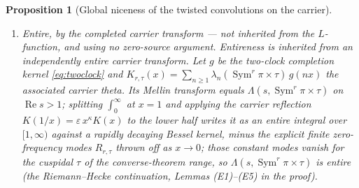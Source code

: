 \documentclass[11pt]{article}
\newtheorem{proposition}[theorem]{Proposition}
\theoremstyle{definition}
\renewcommand{\Re}{\operatorname{Re}}
\newcommand{\Sym}{\operatorname{Sym}}
\begin{document}
\begin{proposition}[Global niceness of the twisted convolutions on the carrier]
\begin{enumerate}
it.) The abscissa is $\Re s=\tfrac12$ (\texttt{scaleBalanced\_iff}).
\item[\textup{(E)}] \emph{Entire}, by the completed carrier transform --- \emph{not} inherited from the
$L$-function, and using no zero-source argument. Entireness is inherited from an independently entire
carrier transform. Let $g$ be the two-clock completion kernel \eqref{eq:twoclock} and
$K_{r,\tau}(x)=\sum_{n\ge1}\lambda_n(\Sym^r\pi\times\tau)\,g(nx)$ the associated carrier theta. Its
Mellin transform equals $\Lambda(s,\Sym^r\pi\times\tau)$ on $\Re s>1$; splitting $\int_0^\infty$ at
$x=1$ and applying the carrier reflection $K(1/x)=\varepsilon\,x^{\kappa}K(x)$ to the lower half writes it
as an entire integral over $[1,\infty)$ against a rapidly decaying Bessel kernel, minus the explicit
finite zero-frequency modes $R_{r,\tau}$ thrown off as $x\to0$; those constant modes vanish for the
cuspidal $\tau$ of the converse-theorem range, so $\Lambda(s,\Sym^r\pi\times\tau)$ is entire (the
Riemann--Hecke continuation, Lemmas \textup{(E1)--(E5)} in the proof).
\end{enumerate}
\end{proposition}
\end{document}
